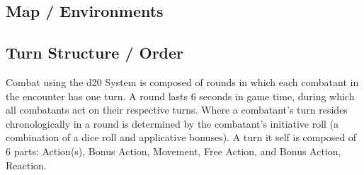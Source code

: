 \documentclass[12pt,a4paper]{report}
\begin{document}
	\subsection{Map / Environments}
	
	\subsection{Turn Structure / Order}
	Combat using the d20 System is composed of rounds in which each combatant in the encounter has one turn.  A round lasts 6 seconds in game time, during which all combatants act on their respective turns. Where a combatant's turn resides chronologically in a round is determined by the combatant's initiative roll (a combination of a dice roll and applicative bonuses). A turn it self is composed of 6 parts: Action(s), Bonus Action, Movement, Free Action, and Bonus Action, Reaction.
\end{document}
